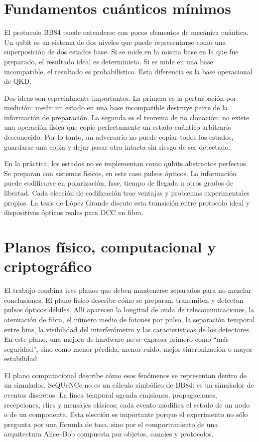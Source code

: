 \section{Fundamentos cuánticos mínimos}

El protocolo BB84 puede entenderse con pocos elementos de mecánica cuántica. Un qubit es un sistema de dos niveles que puede representarse como una superposición de dos estados base. Si se mide en la misma base en la que fue preparado, el resultado ideal es determinista. Si se mide en una base incompatible, el resultado es probabilístico. Esta diferencia es la base operacional de QKD.

Dos ideas son especialmente importantes. La primera es la perturbación por medición: medir un estado en una base incompatible destruye parte de la información de preparación. La segunda es el teorema de no clonación: no existe una operación física que copie perfectamente un estado cuántico arbitrario desconocido. Por lo tanto, un adversario no puede copiar todos los estados, guardarse una copia y dejar pasar otra intacta sin riesgo de ser detectado.

En la práctica, los estados no se implementan como qubits abstractos perfectos. Se preparan con sistemas físicos, en este caso pulsos ópticos. La información puede codificarse en polarización, fase, tiempo de llegada u otros grados de libertad. Cada elección de codificación trae ventajas y problemas experimentales propios. La tesis de López Grande \cite{lopezGrande2018} discute esta transición entre protocolo ideal y dispositivos ópticos reales para DCC en fibra.

\section{Planos físico, computacional y criptográfico}

El trabajo combina tres planos que deben mantenerse separados para no mezclar conclusiones. El plano físico describe cómo se preparan, transmiten y detectan pulsos ópticos débiles. Allí aparecen la longitud de onda de telecomunicaciones, la atenuación de fibra, el número medio de fotones por pulso, la separación temporal entre bins, la visibilidad del interferómetro y las características de los detectores. En este plano, una mejora de hardware no se expresa primero como ``más seguridad'', sino como menor pérdida, menor ruido, mejor sincronización o mayor estabilidad.

El plano computacional describe cómo esos fenómenos se representan dentro de un simulador. SeQUeNCe no es un cálculo simbólico de BB84: es un simulador de eventos discretos. La línea temporal agenda emisiones, propagaciones, recepciones, clics y mensajes clásicos; cada evento modifica el estado de un nodo o de un componente. Esta elección es importante porque el experimento no sólo pregunta por una fórmula de tasa, sino por el comportamiento de una arquitectura Alice--Bob compuesta por objetos, canales y protocolos.

